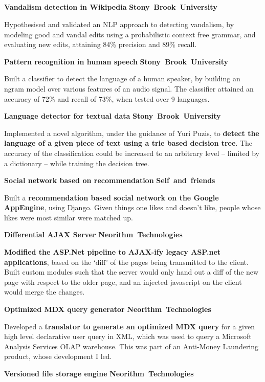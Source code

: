 \documentclass[a4paper,11pt,final]{article}
\newcommand{\resumetitle}[1]{%
  \subsection*{%
    \Large\sc{\textbf{#1}}%
  }%
  
}%
\newcommand{\projexp}[2]{%
  \vspace{12pt}
  \noindent\textbf{{#1}}
  \hfill
  \hbox{\textbf{{#2}}}
  \\ \vspace{-12pt}
}
\newcommand{\resumedescheader}[1]{%
  \bigskip
  \resumetitle{#1}
}%
\begin{document}
\resumedescheader{Projects} 

\vspace{-12pt}
\projexp{Vandalism detection in
  Wikipedia}{Stony Brook University}

\noindent Hypothesised and validated an NLP approach to detecting
vandalism, by modeling good and vandal edits using a probabilistic
context free grammar, and evaluating new edits, attaining 84\%
precision and 89\% recall.

\projexp{Pattern recognition in human speech}{Stony Brook University}

\noindent Built a classifier to detect the language of a human
speaker, by building an ngram model over various features of an audio
signal. The classifier attained an accuracy of 72\% and recall of
73\%, when tested over 9 languages.

\projexp{Language detector for textual data}{Stony Brook University}

\noindent Implemented a novel algorithm, under the guidance of Yuri
Puzis, to \textbf{detect the language of a given piece of text using a
  trie based decision tree}. The accuracy of the classification could
be increased to an arbitrary level -- limited by a dictionary -- while
training the decision tree.

\projexp{Social network based on recommendation}{Self and friends}

\noindent Built a \textbf{recommendation based social network on the
  Google AppEngine}, using Django. Given things one likes and doesn't
like, people whose likes were most similar were matched up.

\projexp{Differential AJAX Server}{Neorithm Technologies}

\noindent \textbf{Modified the ASP.Net pipeline to AJAX-ify legacy
  ASP.net applications}, based on the `diff' of the pages being
transmitted to the client. Built custom modules such that the server
would only hand out a diff of the new page with respect to the older
page, and an injected javascript on the client would merge the
changes.

\projexp{Optimized MDX query generator}{Neorithm Technologies}

\noindent Developed a \textbf{translator to generate an optimized MDX
  query} for a given high level declarative user query in XML, which
was used to query a Microsoft Analysis Services OLAP warehouse. This
was part of an Anti-Money Laundering product, whose development I led.

\projexp{Versioned file storage engine}{Neorithm Technologies}
\end{document}
